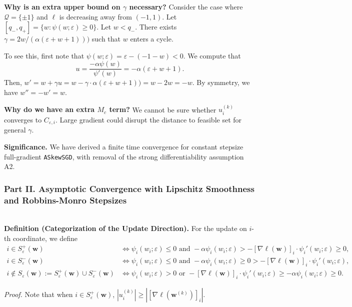 \documentclass[10pt,a4paper]{article}
\begin{document}
\textbf{Why is an extra upper bound on $\gamma$ necessary?} Consider the case where $\mathcal{Q}=\{\pm1\}$ and $\ell$ is decreasing away from $(-1,1)$. Let $[q_-, q_+]=\{w:\psi(w;\varepsilon)\geq0\}$. Let $w<q_-$. There exists $\gamma=2w/(\alpha(\varepsilon+w+1)))$ such that $w$ enters a cycle. 

To see this, first note that $\psi(w;\varepsilon)=\varepsilon-(-1-w)<0$. We compute that $$u=\frac{-\alpha \psi(w)}{\psi'(w)}=-\alpha(\varepsilon+w+1).$$ Then, $w'=w+\gamma u =w-\gamma\cdot\alpha(\varepsilon+w+1))=w-2w=-w.$ By symmetry, we have $w''=-w'=w$. 

\textbf{Why do we have an extra $M_c$ term?} We cannot be sure whether $u_i^{(k)}$ converges to $C_{\varepsilon,i}$. Large gradient could disrupt the distance to feasible set for general $\gamma$.

\textbf{Significance.} We have derived a finite time convergence for constant stepsize full-gradient \texttt{ASkewSGD}, with removal of the strong differentiability assumption A2.

\newpage
\subsubsection{Part II. Asymptotic Convergence with Lipschitz Smoothness and Robbins-Monro Stepsizes}\hfill\\

\textbf{Definition (Categorization of the Update Direction).} 
For the update on $i$-th coordinate, we define  
\begin{align*}
i\in S^{+}_\varepsilon(\mathbf{w}) &\Longleftrightarrow \psi_i(w_i;\varepsilon)\leq 0 \text{ and } -\alpha \psi_i(w_i;\varepsilon)>-[\nabla\ell(\mathbf{w})]_i\cdot \psi_i'(w_i;\varepsilon)\geq0 , \\
i\in S^{-}_\varepsilon(\mathbf{w}) &\Longleftrightarrow \psi_i(w_i;\varepsilon)\leq 0 \text{ and } -\alpha \psi_i(w_i;\varepsilon)\geq0>-[\nabla\ell(\mathbf{w})]_i\cdot \psi_i'(w_i;\varepsilon),\\
i\notin S_\varepsilon(\mathbf{w}):=S^{+}_\varepsilon(\mathbf{w})\cup S^{-}_\varepsilon(\mathbf{w}) &\Longleftrightarrow \psi_i(w_i;\varepsilon)>0 \text{ or }-[\nabla\ell(\mathbf{w})]_i\cdot \psi_i'(w_i;\varepsilon)\geq -\alpha \psi_i(w_i;\varepsilon)\geq 0.
\end{align*}

\textit{Proof.} Note that when $i\in S_\varepsilon^+(\mathbf{w})$, $|u_i^{(k)}|\geq|[\nabla\ell(\mathbf{w}^{(k)})]_i|$. 
\end{document}
